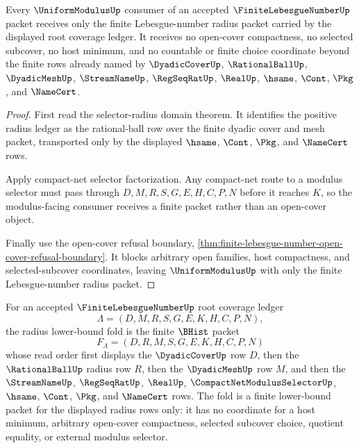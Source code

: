 \begin{theorem}
\label{thm:finite-lebesgue-number-uniform-modulus-radius-exhaustion}
Every $\UniformModulusUp$ consumer of an accepted $\FiniteLebesgueNumberUp$ packet receives only the finite Lebesgue-number radius packet carried by the displayed root coverage ledger. It receives no open-cover compactness, no selected subcover, no host minimum, and no countable or finite choice coordinate beyond the finite rows already named by $\DyadicCoverUp$, $\RationalBallUp$, $\DyadicMeshUp$, $\StreamNameUp$, $\RegSeqRatUp$, $\RealUp$, $\hsame$, $\Cont$, $\Pkg$, and $\NameCert$.
\end{theorem}
\begin{proof}
First read the selector-radius domain theorem. It identifies the positive radius ledger as the rational-ball row over the finite dyadic cover and mesh packet, transported only by the displayed $\hsame$, $\Cont$, $\Pkg$, and $\NameCert$ rows.

Apply compact-net selector factorization. Any compact-net route to a modulus selector must pass through $D,M,R,S,G,E,H,C,P,N$ before it reaches $K$, so the modulus-facing consumer receives a finite packet rather than an open-cover object.

Finally use the open-cover refusal boundary, \autoref{thm:finite-lebesgue-number-open-cover-refusal-boundary}. It blocks arbitrary open families, host compactness, and selected-subcover coordinates, leaving $\UniformModulusUp$ with only the finite Lebesgue-number radius packet.
\end{proof}

\begin{definition}
\label{def:finite-lebesgue-number-radius-lower-bound-fold}
For an accepted $\FiniteLebesgueNumberUp$ root coverage ledger
$$
\Lambda=(D,M,R,S,G,E,K,H,C,P,N),
$$
the radius lower-bound fold is the finite $\BHist$ packet
$$
F_\Lambda=(D,R,M,S,G,E,K,H,C,P,N)
$$
whose read order first displays the $\DyadicCoverUp$ row $D$, then the $\RationalBallUp$ radius row $R$, then the $\DyadicMeshUp$ row $M$, and then the $\StreamNameUp$, $\RegSeqRatUp$, $\RealUp$, $\CompactNetModulusSelectorUp$, $\hsame$, $\Cont$, $\Pkg$, and $\NameCert$ rows. The fold is a finite lower-bound packet for the displayed radius rows only: it has no coordinate for a host minimum, arbitrary open-cover compactness, selected subcover choice, quotient equality, or external modulus selector.
\end{definition}

